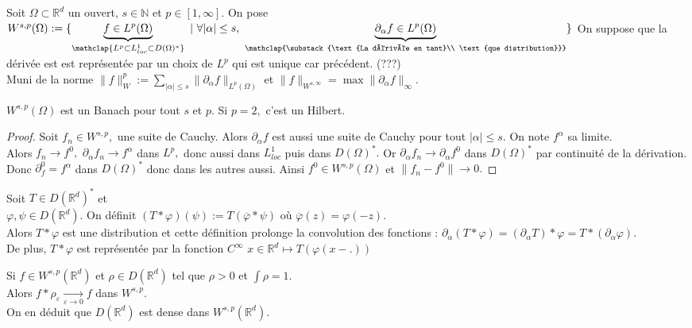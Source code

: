 \begin{definition}
    Soit $\Omega\subset \mathbb{R} ^d$ un ouvert, $s\in \mathbb{N} $ et $p\in [1,\infty ].$ On pose $W ^{s,p}(\Omega):=\{\underbrace{f\in L^p(\Omega)}_{\mathclap{L^p\subset L^1_{loc}\subset D(\Omega)^*}}\ |\ \forall |\alpha | \le s,\ \underbrace{\partial_\alpha f\in L^p(\Omega)}_{\mathclap{\substack{\text{La dérivée en tant}\\ \text{que distribution}}}}\} $ On suppose que la dérivée est est représentée par un choix de $L^p$ qui est unique car précédent. (???)\\
    Muni de la norme $\|f\|_W^p:=\sum\limits_{|\alpha | \le s}^{} \|\partial_\alpha f\|_{L^p(\Omega)} $ et $\|f\|_{W^{s,\infty }}=\max \|\partial_\alpha f\|_\infty $.
\end{definition}
\begin{propriete}
    $W^{s,p}(\Omega)$ est un Banach pour tout $s$ et $p.$ Si $p=2,$ c'est un Hilbert.
\end{propriete}
\begin{proof}
    Soit $f_n\in W^{s,p},$ une suite de Cauchy. Alors $\partial_\alpha f$ est aussi une suite de Cauchy pour tout $|\alpha | \le s.$ On note $f^\alpha $ sa limite.\\
    Alors $f_n\to f^0,$ $\partial_\alpha f_n\to f^\alpha $ dans $L^p,$ donc aussi dans $L^1_{loc}$ puis dans $D(\Omega)^*.$ Or $\partial_\alpha f_n\to \partial_\alpha f^0$ dans $D(\Omega)^*$ par continuité de la dérivation. \\
    Donc $\partial_f^0=f^\alpha $ dans $D(\Omega)^*$ donc dans les autres aussi. Ainsi $f^0\in W^{s,p}(\Omega)$ et $\|f_n-f^0\|\to 0.$
\end{proof}
\begin{propriete}
    Soit $T\in D(\mathbb{R} ^d)^*$ et \\
    $\varphi , \psi\in D(\mathbb{R} ^d).$ On définit $\left( T*\varphi  \right) (\psi):=T(\overline{\varphi }*\psi)$ où $\overline{\varphi }(z)=\varphi (-z).$\\
    Alors $T*\varphi $ est une distribution et cette définition prolonge la convolution des fonctions : $\partial_\alpha (T*\varphi )=(\partial_\alpha T)*\varphi =T*\left( \partial_\alpha \varphi  \right) .$\\
    De plus, $T*\varphi $ est représentée par la fonction $C^\infty $ $x\in \mathbb{R} ^d\mapsto T(\varphi (x-.))$
\end{propriete}
\begin{propriete}
    Si $f\in W^{s,p}(\mathbb{R} ^d)$ et $\rho\in D(\mathbb{R} ^d)$ tel que $\rho>0$ et $\int\rho=1.$\\
    Alors $f*\rho_\varepsilon \underset{\varepsilon \to 0}{\longrightarrow} f$ dans $W^{s,p}.$\\
    On en déduit que $D(\mathbb{R} ^d)$ est dense dans $W^{s,p}(\mathbb{R} ^d).$
\end{propriete}

